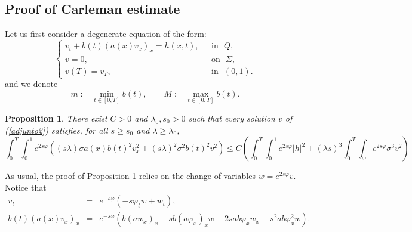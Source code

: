 \documentclass[11pt,oneside,a4papper]{osajnl}
\newcommand{\rea}{\mathbb{R}}
\newtheorem{propo}{Proposition}
\begin{document}
\subsection{Proof of Carleman estimate}

Let us first consider a degenerate equation of the form:
   \begin{equation}\label{adjunto2}
	\begin{cases}
            v_t+b(t)\left(a(x)v_x\right)_x =h(x,t), & \ \ \   \text{in} \ \ \ {Q},\\
		v=0, & \ \ \ \text{on} \ \ \ {\Sigma}, \\
            v(T)=v_T, & \ \ \ \text{in} \ \ \ {(0,1)}.
	\end{cases}
\end{equation}
and we denote
$$
m := \min\limits_{t \in [0,T]} b(t), \qquad M :=\max\limits_{t \in [0,T]} b(t).
$$



\begin{propo}\label{propojva1}
\label{prop_carleman_11}
	There exist $C>0$ and $\lambda_0,  s_0>0$ such that every solution $v$ of (\ref{adjunto2}) satisfies, for all
	$s\geq s_0$ and $\lambda\geq \lambda_0$,
	\begin{equation}\label{ecjv34}
		\int_{0}^{T}\int_{0}^{1}e^{2s\varphi}\left(  (s\lambda)\sigma a(x) b(t)^2 v_x^2+(s\lambda)^2\sigma^2b(t)^2 v^2 \right)\leq C\left(	\int_{0}^{T}\int_{0}^{1} e^{2s\varphi} |h|^2+(\lambda s)^3\int_{0}^{T}\int_{\omega}e^{2s\varphi} \sigma^3  v^2  \right)
	\end{equation}
	
\end{propo}
As usual, the proof of Proposition \ref{propojva1} relies on the change of variables $w=e^{2s\varphi}v$. Notice that
\begin{eqnarray*}
	v_t&=&e^{-s\varphi}(-s\varphi_t w+w_t),\\
	b(t)\left(a(x)v_x\right)_x&=&e^{-s\varphi}(b(a w_x)_x-sb(a\varphi_x)_x w-2sab\varphi_x w_x+s^2ab\varphi^2_x w).
\end{eqnarray*}
\end{document}
